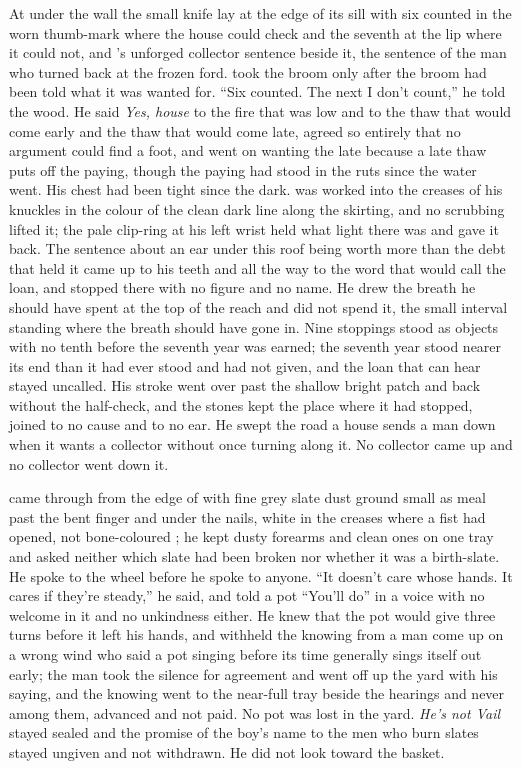 At  under the wall the small knife lay at the edge of its sill with six counted in the worn thumb-mark where the house could check and the seventh at the lip where it could not, and 's unforged collector sentence beside it, the sentence of the man who turned back at the frozen ford.  took the broom only after the broom had been told what it was wanted for. “Six counted. The next I don't count,” he told the wood. He said \emph{Yes, house} to the fire that was low and to the thaw that would come early and the thaw that would come late, agreed so entirely that no argument could find a foot, and went on wanting the late because a late thaw puts off the paying, though the paying had stood in the ruts since the water went. His chest had been tight since the dark.  was worked into the creases of his knuckles in the colour of the clean dark line along the skirting, and no scrubbing lifted it; the pale clip-ring at his left wrist held what light there was and gave it back. The sentence about an ear under this roof being worth more than the debt that held it came up to his teeth and all the way to the word that would call the loan, and stopped there with no figure and no name. He drew the breath he should have spent at the top of the reach and did not spend it, the small interval standing where the breath should have gone in. Nine stoppings stood as objects with no tenth before the seventh year was earned; the seventh year stood nearer its end than it had ever stood and had not given, and the loan that can hear stayed uncalled. His stroke went over  past the shallow bright patch and back without the half-check, and the stones kept the place where it had stopped, joined to no cause and to no ear. He swept the road a house sends a man down when it wants a collector without once turning along it. No collector came up  and no collector went down it.

\scenebreak

 came through from the edge of  with fine grey slate dust ground small as meal past the bent finger and under the nails, white in the creases where a fist had opened, not bone-coloured ; he kept dusty forearms and clean ones on one tray and asked neither which slate had been broken nor whether it was a birth-slate. He spoke to the wheel before he spoke to anyone. “It doesn't care whose hands. It cares if they're steady,” he said, and told a pot “You'll do” in a voice with no welcome in it and no unkindness either. He knew  that the pot would give three turns before it left his hands, and withheld the knowing from a man come up on a wrong wind who said a pot singing before its time generally sings itself out early; the man took the silence for agreement and went off up the yard with his saying, and the knowing went to the near-full tray beside the hearings and never among them, advanced and not paid. No pot was lost in the yard. \emph{He's not Vail} stayed sealed and the promise of the boy's name to the men who burn slates stayed ungiven and not withdrawn. He did not look toward the basket.

